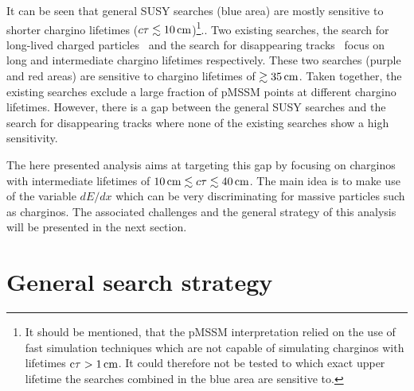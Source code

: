 It can be seen that general SUSY searches (blue area) are mostly sensitive to shorter chargino lifetimes ($c\tau \lesssim 10\,\text{cm}$)\footnote{It should be mentioned, that the pMSSM interpretation relied on the use of fast simulation techniques which are not capable of simulating charginos with lifetimes $\text{c}\tau>1\,\text{cm}$. It could therefore not be tested to which exact upper lifetime the searches combined in the blue area are sensitive to.}.. 
Two existing searches, the search for long-lived charged particles~\cite{bib:CMS:HSCP_8TeV} and the search for disappearing tracks~\cite{bib:CMS:DT_8TeV} focus on long and intermediate chargino lifetimes respectively. 
These two searches (purple and red areas) are sensitive to chargino lifetimes of $\gtrsim 35\,\text{cm}$. 
Taken together, the existing searches exclude a large fraction of pMSSM points at different chargino lifetimes. 
However, there is a gap between the general SUSY searches and the search for disappearing tracks where none of the existing searches show a high sensitivity.

The here presented analysis aims at targeting this gap by focusing on charginos with intermediate lifetimes of $10\,\text{cm} \lesssim c\tau \lesssim 40\,\text{cm}$. 
The main idea is to make use of the variable $dE/dx$ which can be very discriminating for massive particles such as charginos.
The associated challenges and the general strategy of this analysis will be presented in the next section.


\chapter{General search strategy}
\label{sec:GeneralSearchStrategy}

